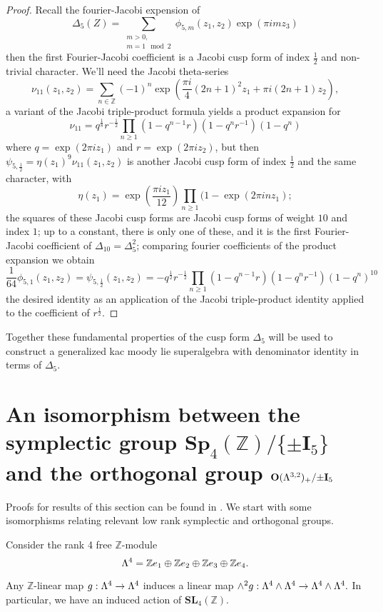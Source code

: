 \documentclass[9pt]{amsart} \usepackage[utf8]{inputenc}
\newcommand{\Z}{\mathbb{Z}} \newcommand{\C}{\mathbb{C}}
\newcommand{\Sp}{\mathbf{Sp}}
\newcommand{\SL}{\mathbf{SL}}
\newcommand{\Orth}{\mathbf{O}}
\newcommand{\Id}{\mathbf{I}}
\begin{document}
\begin{proof}
Recall the fourier-Jacobi expension of $$\Delta_5(Z) =
\displaystyle\sum_{\substack{m>0,\\m = 1
\mod 2}} \phi_{5,m} (z_1,z_2)\exp (\pi i m z_3)$$
then the first Fourier-Jacobi coefficient is a Jacobi cusp form of index
$\frac{1}{2}$ and non-trivial character. We'll need the Jacobi
theta-series $$\nu_{11}(z_1,z_2) = \displaystyle\sum_{n \in \Z} (-1)^n \exp(\frac{\pi
i}{4} (2n + 1)^2 z_1 + \pi i(2n +1) z_2),$$ a variant of the Jacobi
triple-product formula yields a product expansion for $$\nu_{11} =
q^{\frac{1}{8}}r^{-\frac{1}{2}} \displaystyle\prod_{n \geq 1} (1 - q^{n-1} r ) (1 - q^n
r^{-1}) (1 -q^n)$$ where $q = \exp(2\pi i z_1)$ and $r = \exp(2\pi i
z_2)$, but
then $\psi_{5,\frac{1}{2}} = \eta(z_1)^9 \nu_{11}(z_1,z_2)$ is another
Jacobi cusp form of index $\frac{1}{2}$ and the same character, with
$$\eta(z_1) = \exp(\frac{\pi i z_1}{12}) \displaystyle\prod_{n\geq 1} (1 - \exp(2\pi i n
z_1);$$ the
squares of these Jacobi cusp forms are Jacobi cusp forms of weight $10$
and index $1$; up to a constant, there is only one of these, and it is
the first Fourier-Jacobi coefficient of $\Delta_{10} = \Delta_5^2$;
comparing fourier coefficients of the product expansion we obtain $$\frac{1}{64}
\phi_{5,1}(z_1,z_2) = \psi_{5,\frac{1}{2}}(z_1,z_2) =
-q^{\frac{1}{2}}r^{-\frac{1}{2}}\displaystyle\prod_{n\geq 1} (1 - q^{n-1}r )(1 -q^n
r^{-1})(1 - q^n)^{10}$$ the
desired identity as an application of the Jacobi triple-product identity
applied to the coefficient of $r^{\frac{1}{2}}$.
\end{proof}
Together these fundamental properties of the cusp form $\Delta_5$
will be used to construct a generalized kac moody lie superalgebra with
denominator identity in terms of $\Delta_5$.


\section{An isomorphism between
the symplectic group $\Sp_4(\Z)/\{\pm\Id_5\}$ and the orthogonal group
$\Orth(\La^{3,2})_+/{\pm\Id_5}$}

Proofs for results of this section can be found in \cite{KNAPP:1}. We
start with some isomorphisms relating relevant low rank symplectic and
orthogonal groups.


Consider the rank 4 free $\Z$-module $$\La^4 = \Z e_1 \oplus \Z e_2
\oplus \Z e_3 \oplus \Z e_4.$$

Any $\Z$-linear map $g: \Lambda^4 \rightarrow \Lambda^4$ induces a linear map
$\wedge^2 g : \Lambda^4 \wedge \Lambda^4 \rightarrow \Lambda^4 \wedge \Lambda^4.$ In
particular, we have an induced action of $\SL_4(\Z)$.
\end{document}
